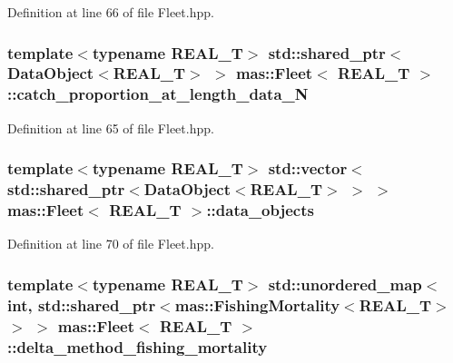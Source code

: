 Definition at line 66 of file Fleet.\-hpp.

\hypertarget{structmas_1_1_fleet_a5bacb0578a3e651fc28a8ba2d233a14b}{
\subsubsection[{catch\-\_\-proportion\-\_\-at\-\_\-length\-\_\-data\-\_\-\-N}]{\setlength{\rightskip}{0pt plus 5cm}template$<$typename R\-E\-A\-L\-\_\-\-T$>$ std\-::shared\-\_\-ptr$<${\bf Data\-Object}$<$R\-E\-A\-L\-\_\-\-T$>$ $>$ {\bf mas\-::\-Fleet}$<$ R\-E\-A\-L\-\_\-\-T $>$\-::catch\-\_\-proportion\-\_\-at\-\_\-length\-\_\-data\-\_\-\-N}}\label{structmas_1_1_fleet_a5bacb0578a3e651fc28a8ba2d233a14b}


Definition at line 65 of file Fleet.\-hpp.

\hypertarget{structmas_1_1_fleet_a9b5dca826b2d1b7b05a705b903a27fad}{
\subsubsection[{data\-\_\-objects}]{\setlength{\rightskip}{0pt plus 5cm}template$<$typename R\-E\-A\-L\-\_\-\-T$>$ std\-::vector$<$std\-::shared\-\_\-ptr$<${\bf Data\-Object}$<$R\-E\-A\-L\-\_\-\-T$>$ $>$ $>$ {\bf mas\-::\-Fleet}$<$ R\-E\-A\-L\-\_\-\-T $>$\-::data\-\_\-objects}}\label{structmas_1_1_fleet_a9b5dca826b2d1b7b05a705b903a27fad}


Definition at line 70 of file Fleet.\-hpp.

\hypertarget{structmas_1_1_fleet_afd6e03157a9ad766993a41d4eb61124c}{
\subsubsection[{delta\-\_\-method\-\_\-fishing\-\_\-mortality}]{\setlength{\rightskip}{0pt plus 5cm}template$<$typename R\-E\-A\-L\-\_\-\-T$>$ std\-::unordered\-\_\-map$<$int, std\-::shared\-\_\-ptr$<${\bf mas\-::\-Fishing\-Mortality}$<$R\-E\-A\-L\-\_\-\-T$>$ $>$ $>$ {\bf mas\-::\-Fleet}$<$ R\-E\-A\-L\-\_\-\-T $>$\-::delta\-\_\-method\-\_\-fishing\-\_\-mortality}}\label{structmas_1_1_fleet_afd6e03157a9ad766993a41d4eb61124c}



